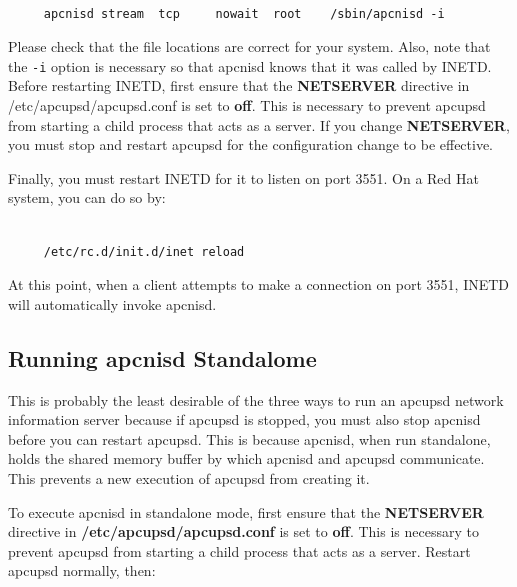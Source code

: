 {{{{{{{{{{\footnotesize
\begin{verbatim}
     
     apcnisd stream  tcp     nowait  root    /sbin/apcnisd -i
\end{verbatim}
\normalsize

Please check that the file locations are correct for your system. Also, note
that the {\tt -i} option is necessary so that apcnisd knows that it was called
by INETD. Before restarting INETD, first ensure that the {\bf NETSERVER}
directive in /etc/apcupsd/apcupsd.conf is set to {\bf off}. This is necessary
to prevent apcupsd from starting a child process that acts as a server. If you
change {\bf NETSERVER}, you must stop and restart apcupsd for the
configuration change to be effective.  

Finally, you must restart INETD for it to listen on port 3551. On a Red Hat
system, you can do so by: 

\footnotesize
\begin{verbatim}
     
     /etc/rc.d/init.d/inet reload
\end{verbatim}
\normalsize

At this point, when a client attempts to make a connection on port 3551, INETD
will automatically invoke apcnisd. 

\label{Running-apcnisd-Standalome}

\subsection*{Running apcnisd Standalome}

This is probably the least desirable of the three ways to run an apcupsd
network information server because if apcupsd is stopped, you must also stop
apcnisd before you can restart apcupsd. This is because apcnisd, when run
standalone, holds the shared memory buffer by which apcnisd and apcupsd
communicate. This prevents a new execution of apcupsd from creating it.  

To execute apcnisd in standalone mode, first ensure that the {\bf NETSERVER}
directive in {\bf /etc/apcupsd/apcupsd.conf} is set to {\bf off}. This is
necessary to prevent apcupsd from starting a child process that acts as a
server. Restart apcupsd normally, then: 

\footnotesize
\begin{verbatim}
     

\end{verbatim}}}}}}}}}}}
